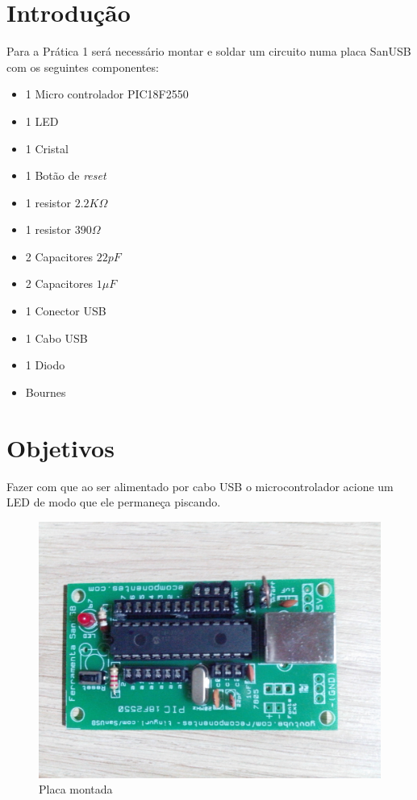 \section{Introdução}\label{introduuxe7uxe3o}

Para a Prática 1 será necessário montar e soldar um circuito numa placa
SanUSB com os seguintes componentes:

\begin{itemize}
\itemsep1pt\parskip0pt
\item
  1 Micro controlador PIC18F2550
\item
  1 LED
\item
  1 Cristal
\item
  1 Botão de \emph{reset}
\item
  1 resistor $2.2K \Omega$
\item
  1 resistor $390 \Omega$
\item
  2 Capacitores $22pF$
\item
  2 Capacitores $1 \mu F$
\item
  1 Conector USB
\item
  1 Cabo USB
\item
  1 Diodo
\item
  Bournes
\end{itemize}

\section{Objetivos}\label{objetivos}

Fazer com que ao ser alimentado por cabo USB o microcontrolador acione
um LED de modo que ele permaneça piscando.

\begin{figure}[h]
    \includegraphics[scale=0.15]{img/placa-1.jpg}
    \caption{Placa montada}
\end{figure}

